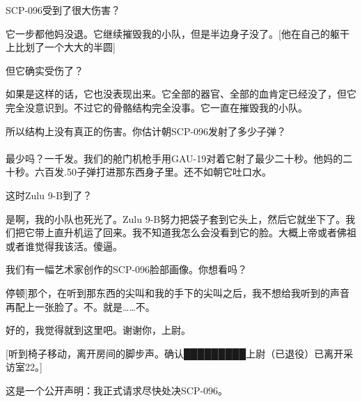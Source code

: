 \begin{scpbox}
SCP-096受到了很大伤害？

它一步都他妈没退。它继续摧毁我的小队，但是半边身子没了。{[}他在自己的躯干上比划了一个大大的半圆]

但它确实受伤了？

如果是这样的话，它也没表现出来。它全部的器官、全部的血肯定已经没了，但它完全没意识到。不过它的骨骼结构完全没事。它一直在摧毁我的小队。

所以结构上没有真正的伤害。你估计朝SCP-096发射了多少子弹？\\
\\
最少吗？一千发。我们的舱门机枪手用GAU-19对着它射了最少二十秒。他妈的二十秒。六百发.50子弹打进那东西身子里。还不如朝它吐口水。

这时Zulu 9-B到了？

是啊，我的小队也死光了。Zulu 9-B努力把袋子套到它头上，然后它就坐下了。我们把它带上直升机运了回来。我不知道我怎么会没看到它的脸。大概上帝或者佛祖或者谁觉得我该活。傻逼。

我们有一幅艺术家创作的SCP-096脸部画像。你想看吗？

\bb{█████████上尉：}{[}停顿]那个，在听到那东西的尖叫和我的手下的尖叫之后，我不想给我听到的声音再配上一张脸了。不。就是……不。

好的，我觉得就到这里吧。谢谢你，上尉。

{[}听到椅子移动，离开房间的脚步声。确认█████████上尉（已退役）已离开采访室22。]

这是一个公开声明：我正式请求尽快处决SCP-096。


\end{scpbox}



